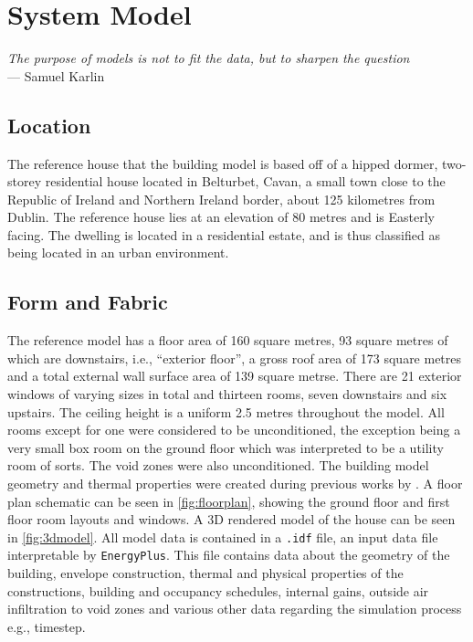 \chapter{System Model}\label{ch:model} 

\begin{flushright}{\slshape
    The purpose of models is not to fit the data, but to sharpen the question} \\ \medskip
    --- Samuel Karlin
\end{flushright}

\section{Location}
The reference house that the building model is based off of a hipped dormer, two-storey residential house located in Belturbet, Cavan, a small town close to the Republic of Ireland and Northern Ireland border, about 125 kilometres from Dublin. The reference house lies at an elevation of 80 metres and is Easterly facing. The dwelling is located in a residential estate, and is thus classified as being located in an urban environment.

\section{Form and Fabric}
The reference model has a floor area of 160 square metres, 93 square metres of which are downstairs, i.e., ``exterior floor'', a gross roof area of 173 square metres and a total external wall surface area of 139 square metrse. There are 21 exterior windows of varying sizes in total and thirteen rooms, seven downstairs and six upstairs. The ceiling height is a uniform 2.5 metres throughout the model. All rooms except for one were considered to be unconditioned, the exception being a very small box room on the ground floor which was interpreted to be a utility room of sorts. The void zones were also unconditioned. The building model geometry and thermal properties were created during previous works by \citeauthor{keogh_technical_2022}. A floor plan schematic can be seen in \cref{fig:floorplan}, showing the ground floor and first floor room layouts and windows. A 3D rendered model of the house can be seen in \cref{fig:3dmodel}. All model data is contained in a \texttt{.idf} file, an input data file interpretable by \texttt{EnergyPlus}. This file contains data about the geometry of the building, envelope construction, thermal and physical properties of the constructions, building and occupancy schedules, internal gains, outside air infiltration to void zones and various other data regarding the simulation process e.g., timestep. 

